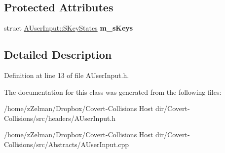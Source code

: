 \subsection*{Protected Attributes}
\begin{DoxyCompactItemize}
\item 
\hypertarget{classAUserInput_a55b881326b920413bbcdf6e02c4fb021}{struct \hyperlink{structAUserInput_1_1SKeyStates}{A\-User\-Input\-::\-S\-Key\-States} {\bfseries m\-\_\-s\-Keys}}\label{classAUserInput_a55b881326b920413bbcdf6e02c4fb021}

\end{DoxyCompactItemize}


\subsection{Detailed Description}


Definition at line 13 of file A\-User\-Input.\-h.



The documentation for this class was generated from the following files\-:\begin{DoxyCompactItemize}
\item 
/home/z\-Zelman/\-Dropbox/\-Covert-\/\-Collisions Host dir/\-Covert-\/\-Collisions/src/headers/A\-User\-Input.\-h\item 
/home/z\-Zelman/\-Dropbox/\-Covert-\/\-Collisions Host dir/\-Covert-\/\-Collisions/src/\-Abstracts/A\-User\-Input.\-cpp\end{DoxyCompactItemize}
